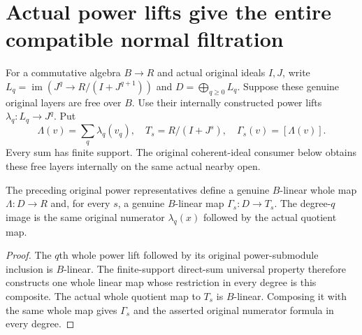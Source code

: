 \section{Actual power lifts give the entire compatible normal filtration}

For a commutative algebra $B\to R$ and actual original ideals $I,J$, write
$L_q=\operatorname{im}(J^q\to R/(I+J^{q+1}))$ and
$D=\bigoplus_{q\geq0}L_q$. Suppose these genuine original layers are free
over $B$. Use their internally constructed power lifts
$\lambda_q:L_q\to J^q$. Put
\[
 \Lambda(v)=\sum_q\lambda_q(v_q),\quad
 T_s=R/(I+J^s),\quad \Gamma_s(v)=[\Lambda(v)].
\]
Every sum has finite support. The original coherent-ideal consumer below
obtains these free layers internally on the same actual nearby open.

\begin{definition}
\label{hir:relative-normal-actual-whole-power-lift-truncation-map}
\leanok
The preceding original power representatives define a genuine $B$-linear
whole map $\Lambda:D\to R$ and, for every $s$, a genuine $B$-linear
map $\Gamma_s:D\to T_s$. The degree-$q$ image is the same original
numerator $\lambda_q(x)$ followed by the actual quotient map.
\end{definition}
\begin{proof}
The $q$th whole power lift followed by its original power-submodule
inclusion is $B$-linear. The finite-support direct-sum universal property
therefore constructs one whole linear map whose restriction in every
degree is this composite. The actual whole quotient map to $T_s$ is
$B$-linear. Composing it with the same whole map gives $\Gamma_s$ and
the asserted original numerator formula in every degree.
\end{proof}

